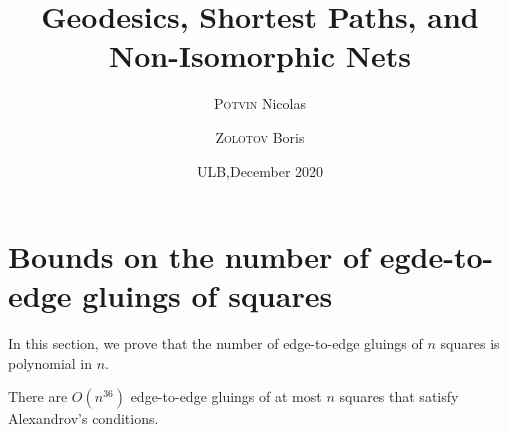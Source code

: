 \documentclass[a4paper,11pt]{article}
\title{Geodesics, Shortest Paths, and Non-Isomorphic Nets}
\author{{\scshape Potvin} Nicolas \and {\scshape Zolotov} Boris}
\date{ULB,\quad December 2020}
\begin{document}
 \maketitle

\section{Bounds on the number of egde-to-edge gluings of squares}

In this section, we prove that the number of edge-to-edge gluings of $n$ squares is polynomial in $n$.

\begin{theorem}
	There are $O \left( n^{36} \right)$ edge-to-edge gluings of at most $n$ squares that satisfy Alexandrov's conditions.
\end{theorem}
\end{document}
